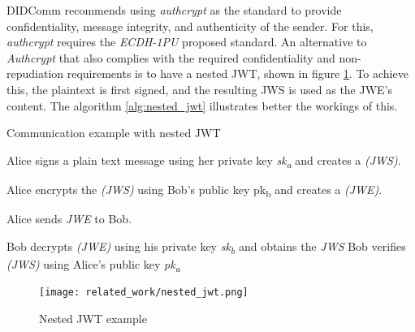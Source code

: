 DIDComm recommends using \emph{authcrypt} as the standard to provide confidentiality, message integrity, and authenticity of the sender. For this, \emph{authcrypt} requires the \emph{ECDH-1PU} proposed standard. An alternative to \emph{Authcrypt} that also complies with the required confidentiality and non-repudiation requirements is to have a nested JWT, shown in figure \ref{fig:nested_jwt}. To achieve this, the plaintext is first signed, and the resulting JWS is used as the JWE's content. The algorithm \ref{alg:nested_jwt} illustrates better the workings of this.

\begin{algorithm}[H]
  \caption{Communication example with nested JWT}
  \label{alg:nested_jwt}
    \begin{algorithmic}[1]
      \State Alice signs a plain text message using her private key \emph{sk\textsubscript{a}} and creates a \emph{(JWS)}.
  
      \State Alice encrypts the \emph{(JWS)} using Bob's public key pk\textsubscript{b} and creates a \emph{(JWE)}.
  
      \State Alice sends \emph{JWE} to Bob.
  
      \State Bob decrypts \emph{(JWE)} using his private key \emph{sk\textsubscript{b}} and obtains the \emph{JWS}
      \State Bob verifies \emph{(JWS)} using Alice's public key \emph{pk\textsubscript{a}}
  \end{algorithmic}
\end{algorithm}
  
\begin{figure}[H]
  \centering
  \texttt{[image: related\_work/nested\_jwt.png]}
  \caption{Nested JWT example}
  \label{fig:nested_jwt}
\end{figure}

 




